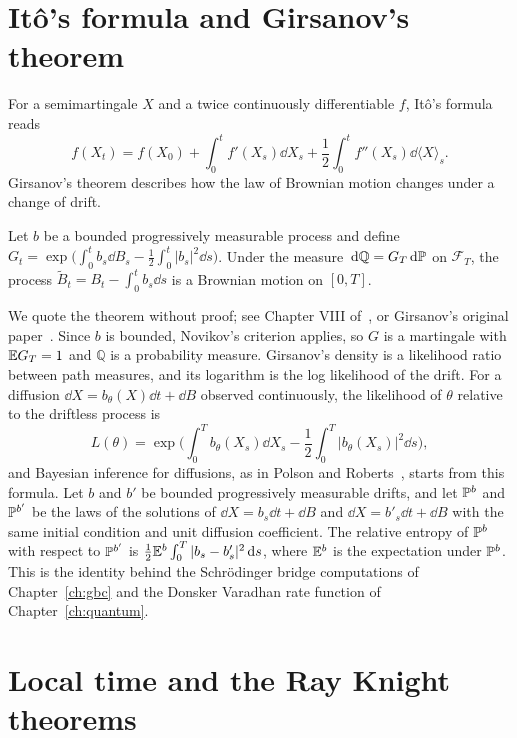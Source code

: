 \section{It\^o's formula and Girsanov's theorem}

For a semimartingale $X$ and a twice continuously differentiable $f$, It\^o's formula reads
\[
f(X_t) = f(X_0)+\int_0^tf'(X_s)\dd X_s+\frac12\int_0^tf''(X_s)\dd\langle X\rangle_s.
\]
Girsanov's theorem describes how the law of Brownian motion changes under a change of drift.

\begin{theorem}[Girsanov]
Let $b$ be a bounded progressively measurable process and define $G_t = \exp\big(\int_0^tb_s\dd B_s-\frac12\int_0^t|b_s|^2\dd s\big)$. Under the measure $\dd\mathbb{Q} = G_T\dd\P$ on $\mathcal{F}_T$, the process $\tilde B_t = B_t-\int_0^tb_s\dd s$ is a Brownian motion on $[0,T]$.
\end{theorem}

We quote the theorem without proof; see Chapter VIII of~\cite{revuzyor}, or Girsanov's original paper~\cite{girsanov1960}. Since $b$ is bounded, Novikov's criterion applies, so $G$ is a martingale with $\E G_T = 1$ and $\mathbb{Q}$ is a probability measure. Girsanov's density is a likelihood ratio between path measures, and its logarithm is the log likelihood of the drift. For a diffusion $\dd X = b_\theta(X)\dd t+\dd B$ observed continuously, the likelihood of $\theta$ relative to the driftless process is
\[
L(\theta) = \exp\Big(\int_0^Tb_\theta(X_s)\dd X_s-\frac12\int_0^T|b_\theta(X_s)|^2\dd s\Big),
\]
and Bayesian inference for diffusions, as in Polson and Roberts~\cite{polsonroberts1994}, starts from this formula. Let $b$ and $b'$ be bounded progressively measurable drifts, and let $\P^b$ and $\P^{b'}$ be the laws of the solutions of $\dd X = b_s\dd t+\dd B$ and $\dd X = b'_s\dd t+\dd B$ with the same initial condition and unit diffusion coefficient. The relative entropy of $\P^b$ with respect to $\P^{b'}$ is $\frac12\E^b\int_0^T|b_s-b'_s|^2\dd s$, where $\E^b$ is the expectation under $\P^b$. This is the identity behind the Schr\"odinger bridge computations of Chapter~\ref{ch:gbc} and the Donsker Varadhan rate function of Chapter~\ref{ch:quantum}.

\section{Local time and the Ray Knight theorems}

